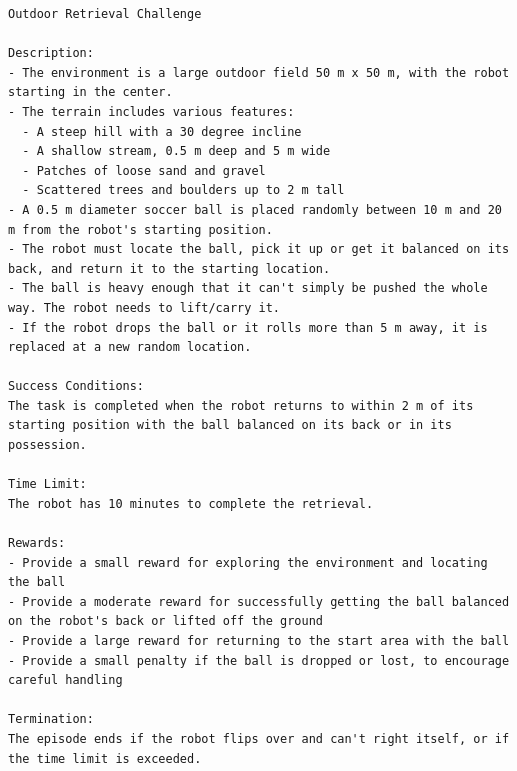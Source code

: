 \begin{lstlisting}[language={}]
Outdoor Retrieval Challenge

Description:
- The environment is a large outdoor field 50 m x 50 m, with the robot starting in the center. 
- The terrain includes various features:
  - A steep hill with a 30 degree incline
  - A shallow stream, 0.5 m deep and 5 m wide
  - Patches of loose sand and gravel
  - Scattered trees and boulders up to 2 m tall
- A 0.5 m diameter soccer ball is placed randomly between 10 m and 20 m from the robot's starting position.
- The robot must locate the ball, pick it up or get it balanced on its back, and return it to the starting location.
- The ball is heavy enough that it can't simply be pushed the whole way. The robot needs to lift/carry it.
- If the robot drops the ball or it rolls more than 5 m away, it is replaced at a new random location.

Success Conditions:
The task is completed when the robot returns to within 2 m of its starting position with the ball balanced on its back or in its possession.

Time Limit:
The robot has 10 minutes to complete the retrieval.

Rewards:
- Provide a small reward for exploring the environment and locating the ball
- Provide a moderate reward for successfully getting the ball balanced on the robot's back or lifted off the ground 
- Provide a large reward for returning to the start area with the ball
- Provide a small penalty if the ball is dropped or lost, to encourage careful handling

Termination:
The episode ends if the robot flips over and can't right itself, or if the time limit is exceeded.
\end{lstlisting}
